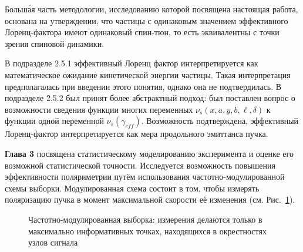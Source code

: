 Больш\'{а}я часть методологии, исследованию которой посвящена настоящая работа, основана на утверждении, что 
частицы с одинаковым значением эффективного Лоренц-фактора имеют одинаковый спин-тюн, 
то есть эквивалентны с точки зрения спиновой динамики.

В подразделе 2.5.1 эффективный Лоренц фактор интерпретируется как 
математическое ожидание кинетической энергии частицы. Такая интерпретация предполагалась при введении
этого понятия, однако она не подтвердилась. В подразделе 2.5.2 был принят более абстрактный подход: 
был поставлен вопрос о возможности сведения функции многих переменных $\nu_s(x,a,y,b,\ell,\delta)$ 
к функции одной переменной $\nu_s(\gamma_{eff})$. Возможность подтверждена, эффективный Лоренц-фактор
интерпретируется как мера продольного эмиттанса пучка.

\textbf{Глава 3} посвящена статистическому моделированию эксперимента 
и оценке его возможной статистической точности. Исследуется возможность повышения эффективности
поляриметрии путём использования частотно-модулированной схемы выборки. Модулированная схема 
состоит в том, чтобы измерять поляризацию пучка в момент максимальной скорости её изменения 
(см. Рис.~\ref{fig:modulated_sampling}).

\begin{figure}[H]\centering
	\begin{minipage}{.6\linewidth}
	
	\end{minipage}%
	\begin{minipage}{.4\linewidth}
	\caption{Частотно-модулированная выборка: измерения делаются только в максимально информативных точках,
		находящихся в окрестностях узлов сигнала\label{fig:modulated_sampling}}
	\end{minipage}
\end{figure}

